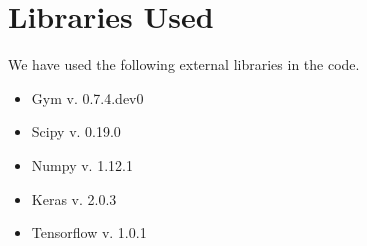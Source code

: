 \documentclass[11pt]{article}
\begin{document}
\section{Libraries Used}\label{c:lib}
We have used the following external libraries in the code.
\begin{itemize}
\item Gym v. 0.7.4.dev0
\item Scipy v. 0.19.0
\item Numpy v. 1.12.1
\item Keras v. 2.0.3
\item Tensorflow v. 1.0.1
\end{itemize}
\end{document}

